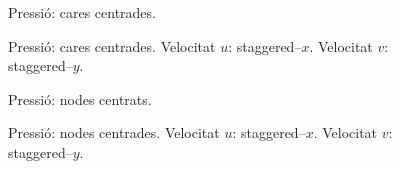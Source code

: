 \begin{figure}[h]
    \centering
    
    \caption*{Pressió: cares centrades.}
    \vspace{0.7cm}
    
    \caption*{Pressió: cares centrades. Velocitat $u$: staggered--$x$. Velocitat $v$: staggered--$y$.}
\end{figure}


\clearpage
\begin{figure}[h]
    \centering
    
    \caption*{Pressió: nodes centrats.}
    \vspace{0.7cm}
    
    \caption*{Pressió: nodes centrades. Velocitat $u$: staggered--$x$. Velocitat $v$: staggered--$y$.}
\end{figure}

